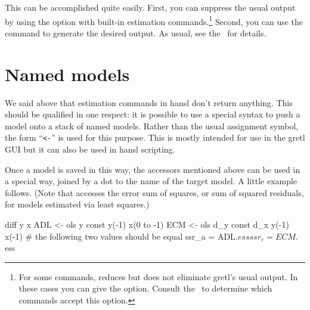 This can be accomplished quite easily. First, you can suppress the
usual output by using the  option with built-in
estimation commands.\footnote{For some commands, 
  reduces but does not eliminate gretl's usual output. In these cases
  you can give the  option. Consult the \GCR\ to
  determine which commands accept this option.} Second, you can
use the  command to generate the desired output.
As usual, see the \GCR\ for details.

\section{Named models}

We said above that estimation commands in hansl don't return
anything. This should be qualified in one respect: it is possible to
use a special syntax to push a model onto a stack of named models.
Rather than the usual assignment symbol, the form ``\verb|<-|'' is
used for this purpose. This is mostly intended for use in the gretl
GUI but it can also be used in hansl scripting.

Once a model is saved in this way, the accessors mentioned above can
be used in a special way, joined by a dot to the name of the target
model. A little example follows. (Note that  accesses the
error sum of squares, or sum of squared residuals, for models
estimated via least squares.)

\begin{code}
diff y x
ADL <- ols y const y(-1) x(0 to -1)
ECM <- ols d_y const d_x y(-1) x(-1)
# the following two values should be equal
ssr_a = ADL.$ess
ssr_e = ECM.$ess
\end{code}


